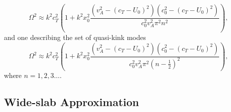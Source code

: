 \documentclass[12pt]{ociamthesis}
\begin{document}
\begin{equation}
\label{disprelslabthinsausbody}
\Omega^2
\approx k^2 c_T^2
\left(1 + k^2 x_0^2 \dfrac{(v_A^2 - (c_T - U_0)^2 )(c_0^2 - (c_T - U_0)^2)}
{c_0^2 v_A^2 \pi^2 n^2} \right),
\end{equation}
and one describing the set of quasi-kink modes
\begin{equation}
\label{disprelslabthinkinkbody}
\Omega^2
\approx k^2 c_T^2
\left( 1 + k^2 x_0^2 \dfrac{(v_A^2 - (c_T - U_0)^2 )(c_0^2 - (c_T - U_0)^2)}
{c_0^2 v_A^2 \pi^2 (n- \frac{1}{2})^2} \right),
\end{equation}
where $n = 1, 2, 3 \dots$.



\subsection{Wide-slab Approximation}
\label{subsec:wide}
\end{document}
